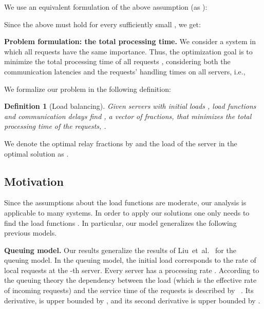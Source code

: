 \documentclass[11pt]{article}
\newtheorem{definition}{Definition}
\begin{document}
We use an equivalent formulation of the above assumption (as ):

Since the above must hold for every sufficiently small , we get:



\medskip

\noindent
\textbf{Problem formulation: the total processing time.}\quad
We consider a system in which all requests have the same importance. Thus, 
the optimization goal is to minimize the total processing time of all requests , considering both the communication latencies and the requests' handling times on all servers, i.e., 

\medskip

We formalize our problem in the following definition:
\begin{definition}[Load balancing]
Given  servers with initial loads , load functions  and  communication delays  find , a vector of fractions, that minimizes the total processing time of the requests, .
\end{definition}

We denote the optimal relay fractions by  and the load of the server  in the optimal solution as .
















\subsection{Motivation}\label{sec:specialCases}

Since the assumptions about the load functions are moderate, our analysis is applicable to many systems. In order to apply our solutions one only needs to find the load functions . In particular, our model generalizes the following previous models.

\medskip
\noindent
\textbf{Queuing model.}\quad
Our results generalize the results of Liu~et~al.~\cite{Liu:2011:GGL:1993744.1993767} for the queuing model.
In the queuing model, the initial load  corresponds to the rate of local requests at the -th server. Every server  has a processing rate . According to the queuing theory the dependency between the load  (which is the effective rate of incoming requests) and the service time of the requests is described by ~\cite{Gross:2008:FQT:1972549}.
Its derivative,  is upper bounded by , and its second derivative  is upper bounded by .
\end{document}
